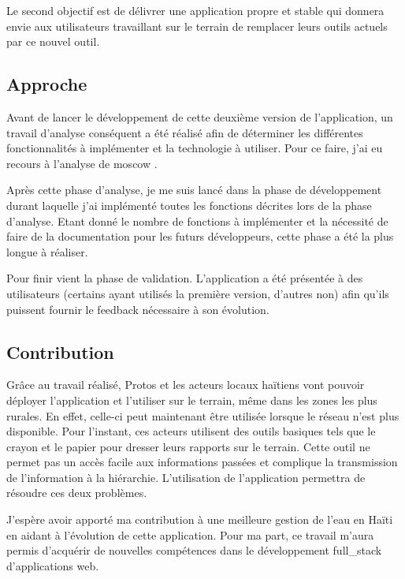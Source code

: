 \documentclass{EPL-master-thesis-covers-FR}
\begin{document}
			Le second objectif est de délivrer une application propre et stable qui donnera envie aux utilisateurs travaillant sur le terrain de remplacer leurs outils actuels par ce nouvel outil.
			
			
		\subsection*{Approche}
			Avant de lancer le développement de cette deuxième version de l'application, un travail d'analyse conséquent a été réalisé afin de déterminer les différentes fonctionnalités à implémenter et la technologie à utiliser. Pour ce faire, j'ai eu recours à l'analyse de \gls{moscow} \cite{ref:moscow}.
		
			Après cette phase d'analyse, je me suis lancé dans la phase de développement durant laquelle j'ai implémenté toutes les fonctions décrites lors de la phase d'analyse. Etant donné le nombre de fonctions à implémenter et la nécessité de faire de la documentation pour les futurs développeurs, cette phase a été la plus longue à réaliser.
						
			Pour finir vient la phase de validation. L'application a été présentée à des utilisateurs (certains ayant utilisés la première version, d'autres non) afin qu'ils puissent fournir le feedback nécessaire à son évolution.
			
			
		\subsection*{Contribution}
			Grâce au travail réalisé, Protos et les acteurs locaux haïtiens vont pouvoir déployer l'application et l'utiliser sur le terrain, même dans les zones les plus rurales. En effet, celle-ci peut maintenant être utilisée lorsque le réseau n'est plus disponible. Pour l'instant, ces acteurs utilisent des outils basiques tels que le crayon et le papier pour dresser leurs rapports sur le terrain. Cette outil ne permet pas un accès facile aux informations passées et complique la transmission de l'information à la hiérarchie. L'utilisation de l'application permettra de résoudre ces deux problèmes.
			
			J'espère avoir apporté ma contribution à une meilleure gestion de l'eau en Haïti en aidant à l'évolution de cette application. Pour ma part, ce travail m'aura permis d'acquérir de nouvelles compétences dans le développement \gls{full_stack} d'applications web.
			
\end{document}

